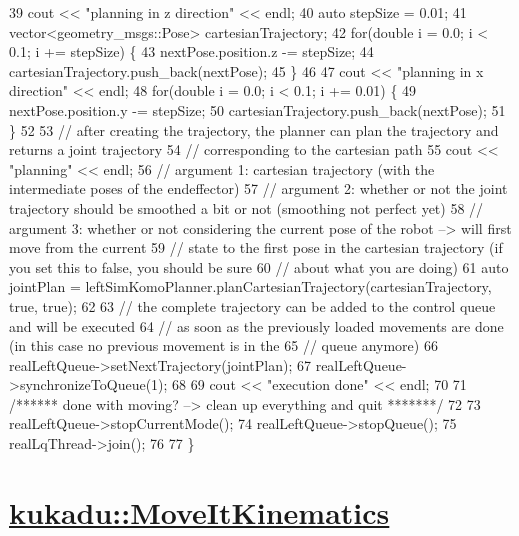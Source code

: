 \begin{DoxyCodeInclude}
39     cout << \textcolor{stringliteral}{"planning in z direction"} << endl;
40     \textcolor{keyword}{auto} stepSize = 0.01;
41     vector<geometry\_msgs::Pose> cartesianTrajectory;
42     \textcolor{keywordflow}{for}(\textcolor{keywordtype}{double} i = 0.0; i < 0.1; i += stepSize) \{
43         nextPose.position.z -= stepSize;
44         cartesianTrajectory.push\_back(nextPose);
45     \}
46 
47     cout << \textcolor{stringliteral}{"planning in x direction"} << endl;
48     \textcolor{keywordflow}{for}(\textcolor{keywordtype}{double} i = 0.0; i < 0.1; i += 0.01) \{
49         nextPose.position.y -= stepSize;
50         cartesianTrajectory.push\_back(nextPose);
51     \}
52 
53     \textcolor{comment}{// after creating the trajectory, the planner can plan the trajectory and returns a joint trajectory}
54     \textcolor{comment}{// corresponding to the cartesian path}
55     cout << \textcolor{stringliteral}{"planning"} << endl;
56     \textcolor{comment}{// argument 1: cartesian trajectory (with the intermediate poses of the endeffector)}
57     \textcolor{comment}{// argument 2: whether or not the joint trajectory should be smoothed a bit or not (smoothing not
       perfect yet)}
58     \textcolor{comment}{// argument 3: whether or not considering the current pose of the robot --> will first move from the
       current}
59     \textcolor{comment}{// state to the first pose in the cartesian trajectory (if you set this to false, you should be sure}
60     \textcolor{comment}{// about what you are doing)}
61     \textcolor{keyword}{auto} jointPlan = leftSimKomoPlanner.planCartesianTrajectory(cartesianTrajectory, \textcolor{keyword}{true}, \textcolor{keyword}{true});
62 
63     \textcolor{comment}{// the complete trajectory can be added to the control queue and will be executed}
64     \textcolor{comment}{// as soon as the previously loaded movements are done (in this case no previous movement is in the}
65     \textcolor{comment}{// queue anymore)}
66     realLeftQueue->setNextTrajectory(jointPlan);
67     realLeftQueue->synchronizeToQueue(1);
68 
69     cout << \textcolor{stringliteral}{"execution done"} << endl;
70 
71     \textcolor{comment}{/****** done with moving? --> clean up everything and quit *******/}
72 
73     realLeftQueue->stopCurrentMode();
74     realLeftQueue->stopQueue();
75     realLqThread->join();
76 
77 \}
\end{DoxyCodeInclude}


\section*{\hyperlink{classkukadu_1_1MoveItKinematics}{kukadu\-::\-Move\-It\-Kinematics}}

